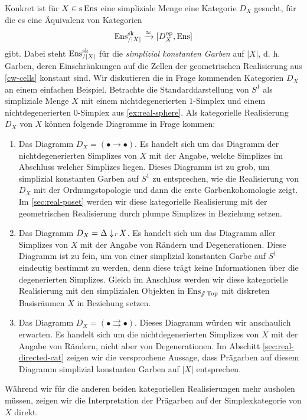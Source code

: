 Konkret ist für $X \in \operatorname{s}\operatorname{Ens}$ eine simpliziale Menge eine Kategorie
$D_X$ gesucht, für die es eine Äquivalenz von Kategorien
\[ \operatorname{Ens}_{/|X|}^{\operatorname{sk}} \xrightarrow{\approx} {[D_X^\mathrm{op}, \operatorname{Ens}]} \]
gibt. Dabei steht $\operatorname{Ens}_{/|X|}^{\operatorname{sk}}$ für die \emph{simplizial
  konstanten Garben} auf $|X|$, d. h. Garben, deren Einschränkungen
auf die Zellen der geometrischen Realisierung aus \ref{cw-cells}
konstant sind. Wir diskutieren die in Frage kommenden Kategorien $D_X$
an einem einfachen Beispiel. Betrachte die Standarddarstellung von
$S^1$ als simpliziale Menge $X$ mit einem nichtdegenerierten
$1$-Simplex und einem nichtdegenerierten $0$-Simplex aus
\ref{ex:real-sphere}. Als kategorielle Realisierung $D_X$ von $X$
können folgende Diagramme in Frage kommen:
\begin{enumerate}
\item Das Diagramm $D_X = (\bullet \to \bullet)$. Es handelt sich um
  das Diagramm der nichtdegenerierten Simplizes von $X$ mit der
  Angabe, welche Simplizes im Abschluss welcher Simplizes
  liegen. Dieses Diagramm ist zu grob, um simplizial konstanten Garben
  auf $S^1$ zu entsprechen, wie die Realisierung von $D_X$ mit der
  Ordnungstopologie und dann die erste Garbenkohomologie zeigt. Im
  \autoref{sec:real-poset} werden wir diese kategorielle Realisierung
  mit der geometrischen Realisierung durch plumpe Simplizes in
  Beziehung setzen.
\item Das Diagramm $D_X = \Delta \downarrow \! {\scriptstyle r} \, X$. Es handelt sich um
  das Diagramm aller Simplizes von $X$ mit der Angabe von Rändern und
  Degenerationen. Diese Diagramm ist zu fein, um von einer simplizial
  konstanten Garbe auf $S^1$ eindeutig bestimmt zu werden, denn diese
  trägt keine Informationen über die degenerierten Simplizes. Gleich
  im Anschluss werden wir diese kategorielle Realisierung mit den
  simplizialen Objekten in $\operatorname{Ens}_{\mathbin{/\mkern-6mu/} \operatorname{Top}}$ mit diskreten Basisräumen $X$
  in Beziehung setzen.
\item Das Diagramm $D_X = (\bullet \rightrightarrows \bullet)$. Dieses
  Diagramm würden wir anschaulich erwarten. Es handelt sich um die
  nichtdegenerierten Simplizes von $X$ mit der Angabe von Rändern,
  nicht aber von Degenerationen. Im Abschitt
  \ref{sec:real-directed-cat} zeigen wir die versprochene Aussage,
  dass Prägarben auf diesem Diagramm simplizial konstanten Garben auf
  $|X|$ entsprechen.
\end{enumerate}

Während wir für die anderen beiden kategoriellen Realisierungen mehr
ausholen müssen, zeigen wir die Interpretation der Prägarben auf der
Simplexkategorie von $X$ direkt.


